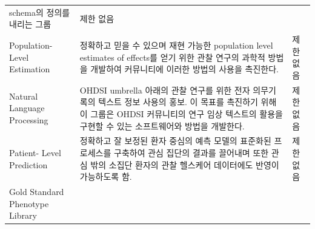 \documentclass[11pt]{book}
\theoremstyle{definition}
\theoremstyle{definition}
\theoremstyle{definition}
\theoremstyle{remark}
\begin{document}
\begin{longtable}[]{@{}lll@{}}
\begin{minipage}[t]{0.30\columnwidth}
schema의 정의를 내리는 그룹\strut
\end{minipage} & \begin{minipage}[t]{0.15\columnwidth}\raggedright\strut
제한 없음\strut
\end{minipage}\tabularnewline
\begin{minipage}[t]{0.11\columnwidth}\raggedright\strut
Population- Level Estimation\strut
\end{minipage} & \begin{minipage}[t]{0.30\columnwidth}\raggedright\strut
정확하고 믿을 수 있으며 재현 가능한 population level estimates of
effects를 얻기 위한 관찰 연구의 과학적 방법을 개발하여 커뮤니티에 이러한
방법의 사용을 촉진한다.\strut
\end{minipage} & \begin{minipage}[t]{0.15\columnwidth}\raggedright\strut
제한 없음\strut
\end{minipage}\tabularnewline
\begin{minipage}[t]{0.11\columnwidth}\raggedright\strut
Natural Language Processing\strut
\end{minipage} & \begin{minipage}[t]{0.30\columnwidth}\raggedright\strut
OHDSI umbrella 아래의 관찰 연구를 위한 전자 의무기록의 텍스트 정보
사용의 홍보. 이 목표를 촉진하기 위해 이 그룹은 OHDSI 커뮤니티의 연구
임상 텍스트의 활용을 구현할 수 있는 소프트웨어와 방법을 개발한다.\strut
\end{minipage} & \begin{minipage}[t]{0.15\columnwidth}\raggedright\strut
제한 없음\strut
\end{minipage}\tabularnewline
\begin{minipage}[t]{0.11\columnwidth}\raggedright\strut
Patient- Level Prediction\strut
\end{minipage} & \begin{minipage}[t]{0.30\columnwidth}\raggedright\strut
정확하고 잘 보정된 환자 중심의 예측 모델의 표준화된 프로세스를 구축하여
관심 집단의 결과를 끌어내며 또한 관심 밖의 소집단 환자의 관찰 헬스케어
데이터에도 반영이 가능하도록 함.\strut
\end{minipage} & \begin{minipage}[t]{0.15\columnwidth}\raggedright\strut
제한 없음\strut
\end{minipage}\tabularnewline
\begin{minipage}[t]{0.11\columnwidth}\raggedright\strut
Gold Standard Phenotype Library\strut
\end{minipage} & \begin{minipage}[t]{0.30\columnwidth}\raggedright\strut

\end{minipage}
\end{longtable}
\end{document}
